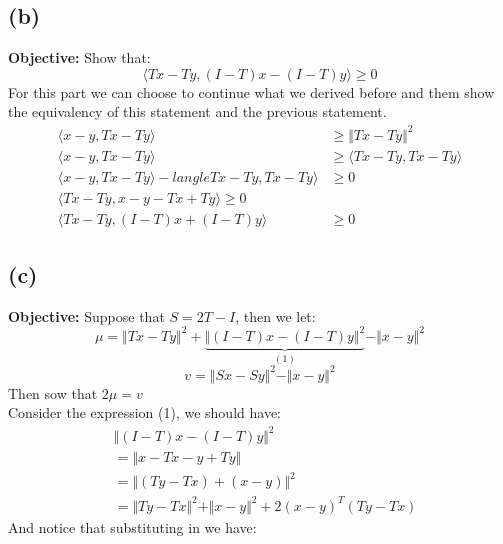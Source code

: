 \documentclass[]{article}
\begin{document}
    \subsection*{(b)}
        \textbf{Objective: }Show that: 
        $$
            \langle Tx - Ty, (I - T)x - (I - T)y\rangle \ge 0
        $$
        For this part we can choose to continue what we derived before and them show the equivalency of this statement and the previous statement. 
        \begin{align*}\tag{3b1}\label{eqn:3b1}
            \langle x - y, Tx - Ty\rangle &\ge \Vert Tx - Ty\Vert^2
            \\
            \langle x - y, Tx - Ty\rangle &\ge \langle Tx - Ty, Tx - Ty\rangle
            \\
            \langle x - y, Tx - Ty\rangle 
            -
            langle Tx - Ty, Tx - Ty\rangle &\ge 0
            \\
            \langle Tx - Ty, x -y - Tx + Ty\rangle \ge 0
            \\
            \langle Tx - Ty, (I - T)x + (I - T)y\rangle &\ge 0
        \end{align*}
    \subsection*{(c)}
        \textbf{Objective: } Suppose that $S = 2T - I$, then we let: 
        $$
        \mu = \Vert Tx  - Ty\Vert^2 +
        \underbrace{\Vert (I - T)x - (I - T)y\Vert^2 }_{(1)}
        - \Vert x - y\Vert^2
        $$
        $$
        v = \Vert Sx - Sy\Vert^2 - \Vert x - y\Vert^2
        $$
        Then sow that $2\mu = v$
        \\
        Consider the expression (1), we should have: 
        \begin{align*}\tag{3c1}\label{eqn:3c1}
            & \Vert (I - T)x - (I - T)y\Vert^2
            \\
            &= 
            \Vert x - Tx - y + Ty\Vert
            \\
            &= 
            \Vert (Ty - Tx) + (x - y)\Vert^2
            \\
            &=
            \Vert Ty - Tx\Vert^2 + \Vert x - y\Vert^2
            + 2(x - y)^T(Ty - Tx)
        \end{align*}
        And notice that substituting in we have: 
\end{document}
